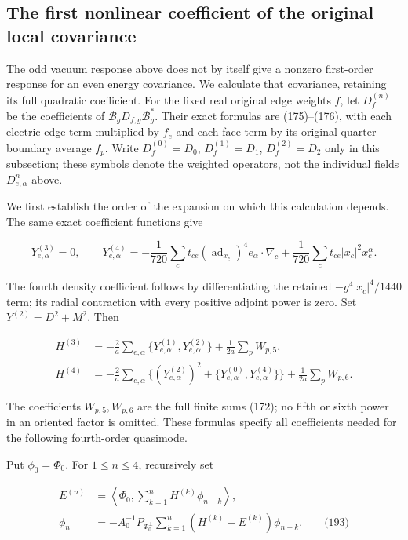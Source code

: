 \subsection{The first nonlinear coefficient of the original local
covariance}\label{nonabelian-vertex-md-the-first-nonlinear-coefficient-of-the-original-local-covariance}

The odd vacuum response above does not by itself give a nonzero
first-order response for an even energy covariance. We calculate that
covariance, retaining its full quadratic coefficient. For the fixed real
original edge weights \(f\), let \(D_f^{(n)}\) be the coefficients of
\(\mathcal B_gD_{f,g}\mathcal B_g^*\). Their exact formulas are
(175)--(176), with each electric edge term multiplied by \(f_e\) and
each face term by its original quarter-boundary average \(f_p\). Write
\(D_f^{(0)}=D_0\), \(D_f^{(1)}=D_1\), \(D_f^{(2)}=D_2\) only in this
subsection; these symbols denote the weighted operators, not the
individual fields \(D^n_{e,\alpha}\) above.

We first establish the order of the expansion on which this calculation
depends. The same exact coefficient functions give

\[
Y^{(3)}_{e,\alpha}=0,\qquad
 Y^{(4)}_{e,\alpha}=
 -\frac1{720}\sum_ct_{ce}(\operatorname{ad}_{x_c})^4e_\alpha
                       \cdot\nabla_c
 +\frac1{720}\sum_ct_{ce}|x_c|^2x_c^\alpha .
\]

The fourth density coefficient follows by differentiating the retained
\(-g^4|x_c|^4/1440\) term; its radial contraction with every positive
adjoint power is zero. Set \(Y^{(2)}=D^2+M^2\). Then

\[
\begin{aligned}
 H^{(3)}&=-\frac2a\sum_{e,\alpha}\{Y^{(1)}_{e,\alpha},Y^{(2)}_{e,\alpha}\}
                             +\frac1{2a}\sum_pW_{p,5},\\
 H^{(4)}&=-\frac2a\sum_{e,\alpha}
       \{(Y^{(2)}_{e,\alpha})^2+
                   \{Y^{(0)}_{e,\alpha},Y^{(4)}_{e,\alpha}\}\}
                             +\frac1{2a}\sum_pW_{p,6}.
\end{aligned}
\]

The coefficients \(W_{p,5},W_{p,6}\) are the full finite sums (172); no
fifth or sixth power in an oriented factor is omitted. These formulas
specify all coefficients needed for the following fourth-order
quasimode.

Put \(\phi_0=\Phi_0\). For \(1\le n\le4\), recursively set

\[
\begin{aligned}
 E^{(n)}&=\left\langle\Phi_0,
                   \sum_{k=1}^nH^{(k)}\phi_{n-k}\right\rangle,\\
 \phi_n&=-A_0^{-1}P_{\Phi_0^\perp}
             \sum_{k=1}^n(H^{(k)}-E^{(k)})\phi_{n-k}.
       \qquad\text{(193)}
\end{aligned}
\]

